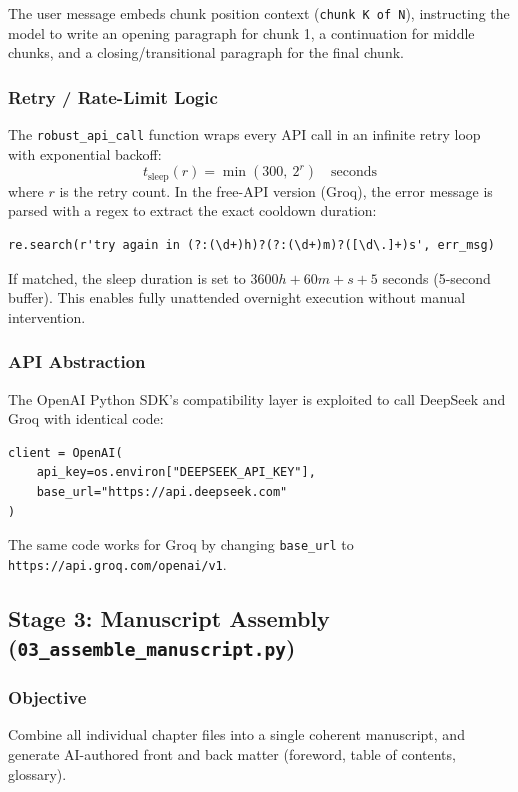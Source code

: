 \documentclass[11pt,a4paper]{article}
\begin{document}
The user message embeds chunk position context (\texttt{chunk K of N}), instructing the model to write an opening paragraph for chunk 1, a continuation for middle chunks, and a closing/transitional paragraph for the final chunk.

\subsubsection{Retry / Rate-Limit Logic}

The \texttt{robust\_api\_call} function wraps every API call in an infinite retry loop with exponential backoff:
\[
t_{\text{sleep}}(r) = \min(300,\ 2^r) \quad \text{seconds}
\]
where $r$ is the retry count. In the free-API version (Groq), the error message is parsed with a regex to extract the exact cooldown duration:
\begin{lstlisting}
re.search(r'try again in (?:(\d+)h)?(?:(\d+)m)?([\d\.]+)s', err_msg)
\end{lstlisting}
If matched, the sleep duration is set to $3600h + 60m + s + 5$ seconds (5-second buffer). This enables fully unattended overnight execution without manual intervention.

\subsubsection{API Abstraction}

The OpenAI Python SDK's compatibility layer is exploited to call DeepSeek and Groq with identical code:
\begin{lstlisting}
client = OpenAI(
    api_key=os.environ["DEEPSEEK_API_KEY"],
    base_url="https://api.deepseek.com"
)
\end{lstlisting}
The same code works for Groq by changing \texttt{base\_url} to \texttt{https://api.groq.com/openai/v1}.

\subsection{Stage 3: Manuscript Assembly (\texttt{03\_assemble\_manuscript.py})}

\subsubsection{Objective}

Combine all individual chapter files into a single coherent manuscript, and generate AI-authored front and back matter (foreword, table of contents, glossary).
\end{document}
